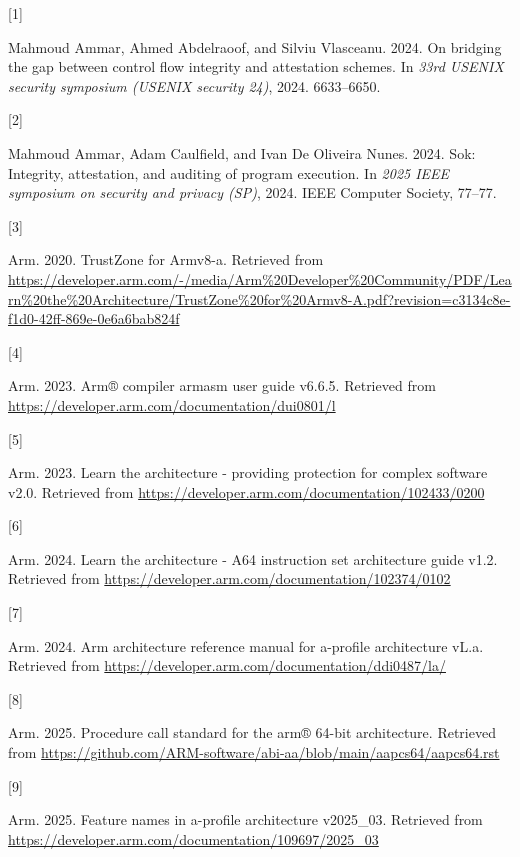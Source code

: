 \documentclass[a4paper, nobind]{templates/ociamthesis}
\newlength{\cslhangindent}
\newlength{\csllabelwidth}
\newenvironment{CSLReferences}[2] %
{\begin{list}{}{%
	\setlength{\itemindent}{0pt}
	\setlength{\leftmargin}{0pt}
	\setlength{\parsep}{0pt}
	\ifodd #1
	\setlength{\leftmargin}{\cslhangindent}
	\setlength{\itemindent}{-1\cslhangindent}
	\fi
	\setlength{\itemsep}{#2\baselineskip}}}
{\end{list}}
\newcommand{\CSLLeftMargin}[1]{\parbox[t]{\csllabelwidth}{\strut#1\strut}}
\newcommand{\CSLRightInline}[1]{\parbox[t]{\linewidth - \csllabelwidth}{\strut#1\strut}}
\begin{document}
\label{refs}
\begin{CSLReferences}{0}{0}
\CSLLeftMargin{{[}1{]} }%
\CSLRightInline{Mahmoud Ammar, Ahmed Abdelraoof, and Silviu Vlasceanu. 2024. On bridging the gap between control flow integrity and attestation schemes. In \emph{33rd USENIX security symposium (USENIX security 24)}, 2024. 6633--6650.}

\CSLLeftMargin{{[}2{]} }%
\CSLRightInline{Mahmoud Ammar, Adam Caulfield, and Ivan De Oliveira Nunes. 2024. Sok: Integrity, attestation, and auditing of program execution. In \emph{2025 IEEE symposium on security and privacy (SP)}, 2024. IEEE Computer Society, 77--77.}

\CSLLeftMargin{{[}3{]} }%
\CSLRightInline{Arm. 2020. TrustZone for Armv8-a. Retrieved from \url{https://developer.arm.com/-/media/Arm\%20Developer\%20Community/PDF/Learn\%20the\%20Architecture/TrustZone\%20for\%20Armv8-A.pdf?revision=c3134c8e-f1d0-42ff-869e-0e6a6bab824f}}

\CSLLeftMargin{{[}4{]} }%
\CSLRightInline{Arm. 2023. Arm® compiler armasm user guide v6.6.5. Retrieved from \url{https://developer.arm.com/documentation/dui0801/l}}

\CSLLeftMargin{{[}5{]} }%
\CSLRightInline{Arm. 2023. Learn the architecture - providing protection for complex software v2.0. Retrieved from \url{https://developer.arm.com/documentation/102433/0200}}

\CSLLeftMargin{{[}6{]} }%
\CSLRightInline{Arm. 2024. Learn the architecture - A64 instruction set architecture guide v1.2. Retrieved from \url{https://developer.arm.com/documentation/102374/0102}}

\CSLLeftMargin{{[}7{]} }%
\CSLRightInline{Arm. 2024. Arm architecture reference manual for a-profile architecture vL.a. Retrieved from \url{https://developer.arm.com/documentation/ddi0487/la/}}

\CSLLeftMargin{{[}8{]} }%
\CSLRightInline{Arm. 2025. Procedure call standard for the arm® 64-bit architecture. Retrieved from \url{https://github.com/ARM-software/abi-aa/blob/main/aapcs64/aapcs64.rst}}

\CSLLeftMargin{{[}9{]} }%
\CSLRightInline{Arm. 2025. Feature names in a-profile architecture v2025\_03. Retrieved from \url{https://developer.arm.com/documentation/109697/2025_03}}


\end{CSLReferences}
\end{document}
